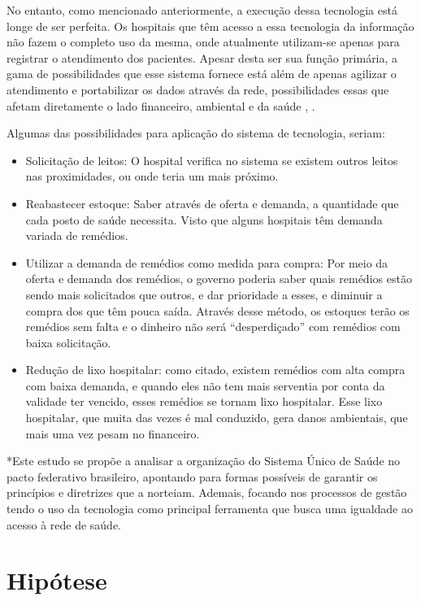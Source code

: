 \documentclass[twoside]{article}
\begin{document}
\begin{multicols}{2}
No entanto, como mencionado anteriormente, a execução dessa tecnologia está longe de ser perfeita. Os hospitais que têm acesso a essa tecnologia da informação não fazem o completo uso da mesma, onde atualmente utilizam-se apenas para registrar o atendimento dos pacientes. Apesar desta ser sua função primária, a gama de possibilidades que esse sistema fornece está além de apenas agilizar o atendimento e portabilizar os dados através da rede, possibilidades essas que afetam diretamente o lado financeiro, ambiental e da saúde \cite{Oliveira_2017}, \cite{Pinheiro_Filho_2012}.

    Algumas das possibilidades para aplicação do sistema de tecnologia, seriam:
    \begin{itemize}
    \item Solicitação de leitos: O hospital verifica no sistema se existem outros leitos nas proximidades, ou onde teria um mais próximo.
    \item Reabastecer estoque: Saber através de oferta e demanda, a quantidade que cada posto de saúde necessita. Visto que alguns hospitais têm demanda variada de remédios.
    \item Utilizar a demanda de remédios como medida para compra: Por meio da oferta e demanda dos remédios, o governo poderia saber quais remédios estão sendo mais solicitados que outros, e dar prioridade a esses, e diminuir a compra dos que têm pouca saída. Através desse método, os estoques terão os remédios sem falta e o dinheiro não será “desperdiçado” com remédios com baixa solicitação.
    \item Redução de lixo hospitalar: como citado, existem remédios com alta compra com baixa demanda, e quando eles não tem mais serventia por conta da validade ter vencido, esses remédios se tornam lixo hospitalar. Esse lixo hospitalar, que muita das vezes é mal conduzido, gera danos ambientais, que mais uma vez pesam no financeiro.
    \end{itemize}
\begin{footnotesize}
*Este estudo se propõe a analisar a organização do Sistema Único de Saúde no pacto federativo brasileiro, apontando para
formas possíveis de garantir os princípios e diretrizes que a norteiam. Ademais, focando nos processos de gestão tendo o uso da tecnologia como principal ferramenta que busca uma igualdade ao acesso à rede de saúde.
\end{footnotesize}
  
\iffalse
  \section{Hipótese}




\end{multicols}
\end{document}
